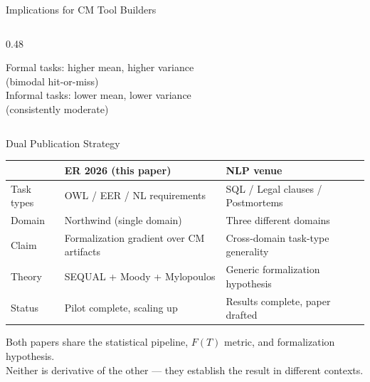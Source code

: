 \documentclass[aspectratio=169]{beamer}
\begin{document}
\begin{frame}{Implications for CM Tool Builders}
\begin{columns}[T]
\begin{column}{0.48\textwidth}

\vspace{0.3em}
{\small Formal tasks: higher mean, higher variance\\(bimodal hit-or-miss)\\Informal tasks: lower mean, lower variance\\(consistently moderate)}
\end{column}
\end{columns}

\end{frame}

\begin{frame}{Dual Publication Strategy}

\begin{table}
\centering
\small
\begin{tabular}{p{2cm}p{4.5cm}p{4.5cm}}
\toprule
& \textbf{ER 2026 (this paper)} & \textbf{NLP venue} \\
\midrule
Task types & OWL / EER / NL requirements & SQL / Legal clauses / Postmortems \\[0.3em]
Domain & Northwind (single domain) & Three different domains \\[0.3em]
Claim & Formalization gradient over CM artifacts & Cross-domain task-type generality \\[0.3em]
Theory & SEQUAL + Moody + Mylopoulos & Generic formalization hypothesis \\[0.3em]
Status & Pilot complete, scaling up & Results complete, paper drafted \\
\bottomrule
\end{tabular}
\end{table}

\vspace{0.5em}
\centering
Both papers share the statistical pipeline, $F(T)$ metric, and formalization hypothesis.\\
Neither is derivative of the other --- they establish the result in different contexts.

\end{frame}
\end{document}

